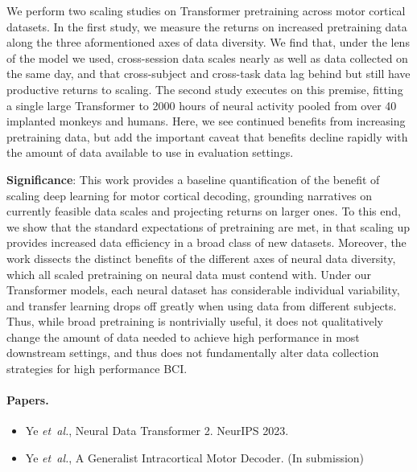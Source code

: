 \documentclass[12pt,oneside]{report}
\DeclareRobustCommand{\etal}{\emph{et~al.}\xspace}
\begin{document}
We perform two scaling studies on Transformer pretraining across motor cortical datasets. In the first study, we measure the returns on increased pretraining data along the three aformentioned axes of data diversity. We find that, under the lens of the model we used, cross-session data scales nearly as well as data collected on the same day, and that cross-subject and cross-task data lag behind but still have productive returns to scaling. The second study executes on this premise, fitting a single large Transformer to 2000 hours of neural activity pooled from over 40 implanted monkeys and humans. Here, we see continued benefits from increasing pretraining data, but add the important caveat that benefits decline rapidly with the amount of data available to use in evaluation settings.

\textbf{Significance}: This work provides a baseline quantification of the benefit of scaling deep learning for motor cortical decoding, grounding narratives on currently feasible data scales and projecting returns on larger ones. To this end, we show that the standard expectations of pretraining are met, in that scaling up provides increased data efficiency in a broad class of new datasets. Moreover, the work dissects the distinct benefits of the different axes of neural data diversity, which all scaled pretraining on neural data must contend with. Under our Transformer models, each neural dataset has considerable individual variability, and transfer learning drops off greatly when using data from different subjects. Thus, while broad pretraining is nontrivially useful, it does not qualitatively change the amount of data needed to achieve high performance in most downstream settings, and thus does not fundamentally alter data collection strategies for high performance BCI.

\paragraph{Papers.}
\begin{itemize}
  \item Ye \etal, Neural Data Transformer 2. NeurIPS 2023.
  \item Ye \etal, A Generalist Intracortical Motor Decoder. (In submission)
\end{itemize}
\end{document}
